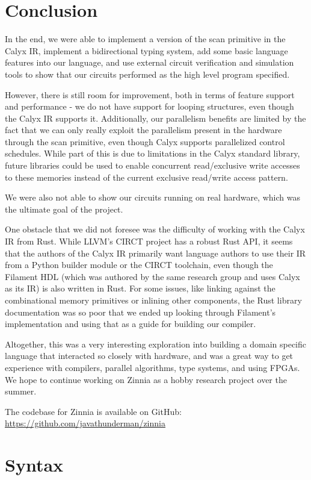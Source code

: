 \documentclass[12pt]{article}
\begin{document}
\section{Conclusion}
In the end, we were able to implement a version of the scan primitive in the Calyx IR, implement a bidirectional
typing system, add some basic language features into our language, and use external circuit verification and simulation
tools to show that our circuits performed as the high level program specified.

However, there is still room for improvement, both in terms of feature support and performance - we do not have support for looping structures,
even though the Calyx IR supports it. Additionally, our parallelism benefits are limited by the fact that we can only really exploit
the parallelism present in the hardware through the scan primitive, even though Calyx supports parallelized control schedules. While part of this
is due to limitations in the Calyx standard library, future libraries could be used to enable concurrent read/exclusive write
accesses to these memories instead of the current exclusive read/write access pattern.

We were also not able to show our circuits running on real hardware, which was the ultimate goal of the project.

One obstacle that we did not foresee was the difficulty of working with the Calyx IR from Rust. While LLVM's CIRCT project
has a robust Rust API, it seems that the authors of the Calyx IR primarily want language authors to use their IR from
a Python builder module or the CIRCT toolchain, even though the Filament HDL (which was authored by the same research
group and uses Calyx as its IR) is also written in Rust. For some issues, like linking against the combinational memory
primitives or inlining other components, the Rust library documentation was so poor that we ended up looking through
Filament's implementation and using that as a guide for building our compiler.

Altogether, this was a very interesting exploration into building a domain specific language that interacted so closely
with hardware, and was a great way to get experience with compilers, parallel algorithms, type systems, and using FPGAs.
We hope to continue working on Zinnia as a hobby research project over the summer.

The codebase for Zinnia is available on GitHub: \url{https://github.com/javathunderman/zinnia}

\section{Syntax}
\setlength{\grammarparsep}{20pt plus 1pt minus 1pt}
\setlength{\grammarindent}{12em}
\end{document}
